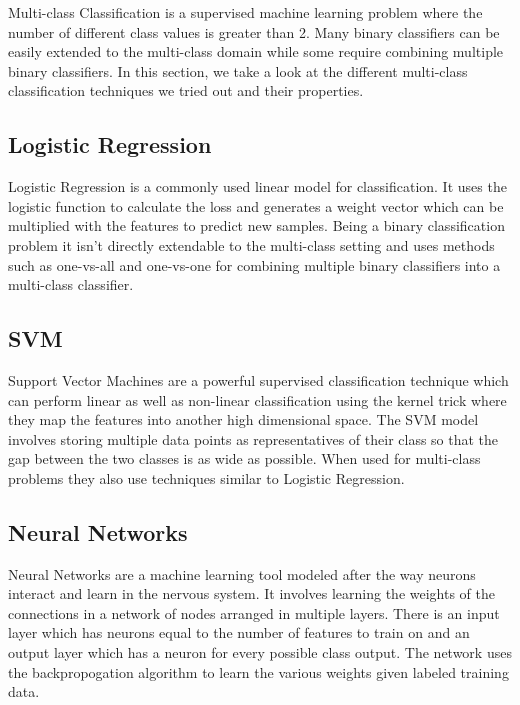 \documentclass[]{sig-alternate}
\begin{document}
Multi-class Classification is a supervised machine learning problem where the number of different class values is greater than 2. Many binary classifiers can be easily extended to the multi-class domain while some require combining multiple binary classifiers. In this section, we take a look at the different multi-class classification techniques we tried out and their properties. 

\subsection{Logistic Regression}
\label{subsec:LogisticRegression}

Logistic Regression is a commonly used linear model for classification. It uses the logistic function to calculate the loss and generates a weight vector which can be multiplied with the features to predict new samples. Being a binary classification problem it isn't directly extendable to the multi-class setting and uses methods such as one-vs-all and one-vs-one for combining multiple binary classifiers into a multi-class classifier. 

\subsection{SVM}
\label{subsec:SVM}

Support Vector Machines are a powerful supervised classification technique which can perform linear as well as non-linear classification using the kernel trick where they map the features into another high dimensional space. The SVM model involves storing multiple data points as representatives of their class so that the gap between the two classes is as wide as possible. When used for multi-class problems they also use techniques similar to Logistic Regression. 

\subsection{Neural Networks}
\label{subsec:NeuralNetworks}

Neural Networks are a machine learning tool modeled after the way neurons interact and learn in the nervous system. It involves learning the weights of the connections in a network of nodes arranged in multiple layers. There is an input layer which has neurons equal to the number of features to train on and an output layer which has a neuron for every possible class output. The network uses the backpropogation algorithm to learn the various weights given labeled training data. 
\end{document}

